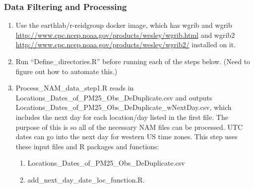 \subsubsection*{Data Filtering and Processing}

\begin{enumerate}

\item Use the earthlab/r-reidgroup docker image, which has wgrib and wgrib \url{http://www.cpc.ncep.noaa.gov/products/wesley/wgrib.html} and wgrib2 \url{http://www.cpc.ncep.noaa.gov/products/wesley/wgrib2/} installed on it.

\item Run ``Define\_directories.R'' before running each of the steps below. (Need to figure out how to automate this.)

\item Process\_NAM\_data\_step1.R reads in Locations\_Dates\_of\_PM25\_Obs\_DeDuplicate.csv and outputs Locations\_Dates\_of\_PM25\_Obs\_DeDuplicate\_wNextDay.csv, which includes the next day for each location/day listed in the first file. The purpose of this is so all of the necessary NAM files can be processed. UTC dates can go into the next day for western US time zones. This step uses these input files and R packages and functions:
	\begin{enumerate}
	\item Locations\_Dates\_of\_PM25\_Obs\_DeDuplicate.csv
	\item add\_next\_day\_date\_loc\_function.R.
	\end{enumerate}
	

\end{enumerate}
